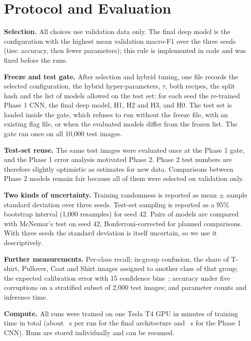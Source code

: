 \section{Protocol and Evaluation}
\label{sec:p2protocol}
\textbf{Selection.} All choices use validation data only. The final deep model is the configuration with the
highest mean validation macro-F1 over the three seeds (ties: accuracy, then fewer parameters); this rule is
implemented in code and was fixed before the runs.

\textbf{Freeze and test gate.} After selection and hybrid tuning, one file records the selected configuration,
the hybrid hyper-parameters, $\tau$, both recipes, the split hash and the list of \NGateModels{} models allowed on
the test set: for each seed the re-trained Phase 1 CNN, the final deep model, H1, H2 and H3, and H0. The test
set is loaded inside the gate, which refuses to run without the freeze file, with an existing flag file, or when
the evaluated models differ from the frozen list. The gate ran once on all 10{,}000 test images.

\textbf{Test-set reuse.} The same test images were evaluated once at the Phase 1 gate, and the Phase 1 error
analysis motivated Phase 2. Phase 2 test numbers are therefore slightly optimistic as estimates for new data.
Comparisons between Phase 2 models remain fair because all of them were selected on validation only.

\textbf{Two kinds of uncertainty.} Training randomness is reported as mean $\pm$ sample standard deviation over
three seeds. Test-set sampling is reported as a 95\% bootstrap interval (1{,}000 resamples) for seed 42. Pairs of
models are compared with McNemar's test on seed 42, Bonferroni-corrected for \NComparisons{} planned comparisons.
With three seeds the standard deviation is itself uncertain, so we use it descriptively.

\textbf{Further measurements.} Per-class recall; in-group confusion, the share of T-shirt, Pullover, Coat and
Shirt images assigned to another class of that group; the expected calibration error with 15 confidence
bins~\cite{guo2017calibration}; accuracy under five corruptions on a stratified subset of 2{,}000 test images; and
parameter counts and inference time.

\textbf{Compute.} All \NRuns{} runs were trained on one Tesla T4 GPU in \TrainMinutesTotal{} minutes of training
time in total (about \TrainSecondsDeeper{}~s per run for the final architecture and \TrainSecondsPone{}~s for the
Phase 1 CNN). Runs are stored individually and can be resumed.
